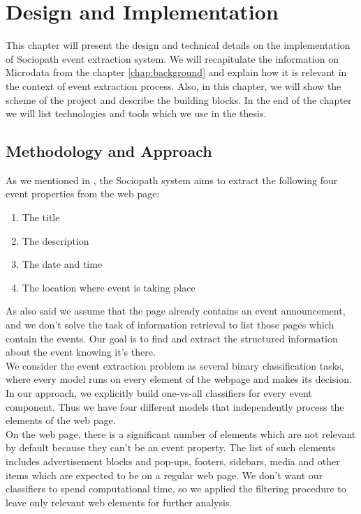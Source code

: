 \chapter{Design and Implementation}
\label{chap:design}
This chapter will present the design and technical details on the implementation of Sociopath event extraction system. We will recapitulate the information on Microdata from the chapter \ref{chap:background} and explain how it is relevant in the context of event extraction process. Also, in this chapter, we will show the scheme of the project and describe the building blocks. In the end of the chapter we will list technologies and tools which we use in the thesis.   

\section{Methodology and Approach}
\label{sec:method}
As we mentioned in , the Sociopath system aims to extract the following four event properties from the web page: 

\begin{enumerate}
    \item The title
    \item The description
    \item The date and time
    \item The location where event is taking place
\end{enumerate}

As also said we assume that the page already contains an event announcement, and we don't solve the task of information retrieval to list those pages which contain the events. Our goal is to find and extract the structured information about the event knowing it's there.\\

We consider the event extraction problem as several binary classification tasks, where every model runs on every element of the webpage and makes its decision. In our approach, we explicitly build one-vs-all classifiers for every event component. Thus we have four different models that independently process the elements of the web page. \\

On the web page, there is a significant number of elements which are not relevant by default because they can't be an event property. The list of such elements includes advertisement blocks and pop-ups, footers, sidebars, media and other items which are expected to be on a regular web page. We don't want our classifiers to spend computational time, so we applied the filtering procedure to leave only relevant web elements for further analysis.\\

